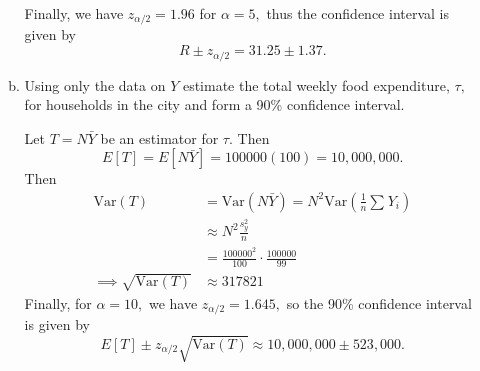 \documentclass{article}
\newcommand{\var}{\mathrm{Var}}
\begin{document}
\begin{itemize}
\begin{enumerate}[a.]
\begin{soln}
					Finally, we have $z_{\alpha/2}=1.96$ for $\alpha=5,$ thus the confidence interval is given by \[R\pm z_{\alpha/2} = \boxed{31.25\pm1.37}.\]
					
				\end{soln}

			\item Using only the data on $Y$ estimate the total weekly food expenditure, $\tau,$ for households in the city and form a 90\% confidence interval.
				\begin{soln}
					Let $T=N\bar{Y}$ be an estimator for $\tau.$ Then \[E[T]=E[N\bar{Y}]=100000(100) = 10, 000, 000.\] Then 
					\begin{align*}
						\var(T) &=\var(N\bar{Y}) = N^2\var\left( \frac{1}{n}\sum_{}^{} Y_i \right) \\
						&\approx N^2 \frac{s_y^2}{n} \\
						&= \frac{100000^2}{100}\cdot \frac{100000}{99} \\
						\implies \sqrt{\var(T)} &\approx 317821
					\end{align*}
					Finally, for $\alpha=10,$ we have $z_{\alpha/2}=1.645,$ so the 90\% confidence interval is given by \[E[T]\pm z_{\alpha/2}\sqrt{\var(T)} \approx \boxed{10, 000, 000 \pm 523, 000}. \]
				\end{soln}
				
		\end{enumerate}

\end{itemize}
\end{document}
